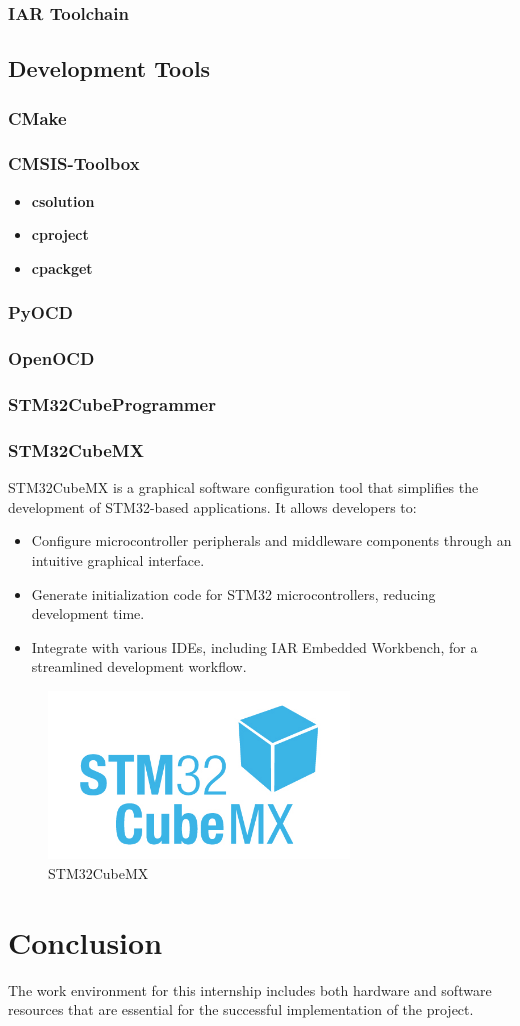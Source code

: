 \subsubsection{IAR Toolchain}
\subsection*{Development Tools}
\subsubsection{CMake}
\subsubsection{CMSIS-Toolbox}
\begin{itemize}
	\item \textbf{csolution}
	\item \textbf{cproject}
	\item \textbf{cpackget}
\end{itemize}
\subsubsection{PyOCD}
\subsubsection{OpenOCD}
\subsubsection{STM32CubeProgrammer}
\subsubsection{STM32CubeMX}
STM32CubeMX is a graphical software configuration tool that simplifies the development of STM32-based applications. It allows developers to:
\begin{itemize}
	\item Configure microcontroller peripherals and middleware components through an intuitive graphical interface.
	\item Generate initialization code for STM32 microcontrollers, reducing development time.
	\item Integrate with various IDEs, including IAR Embedded Workbench, for a streamlined development workflow.
\end{itemize}
\begin{figure}[H]
	\centering
	\includegraphics[width=8cm]{img/CUBEMX.jpg}
	\caption{STM32CubeMX}
	\label{fig:mx}
\end{figure}
\section*{Conclusion}
The work environment for this internship includes both hardware and software resources that are essential for the successful implementation of the project.
